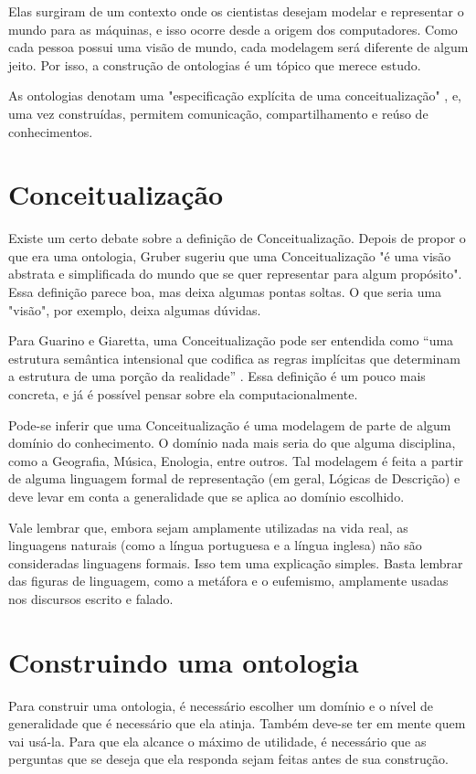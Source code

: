 Elas surgiram de um contexto onde os cientistas desejam modelar e representar o mundo para as máquinas, e isso ocorre desde a origem dos computadores. Como cada pessoa possui uma visão de mundo, cada modelagem será diferente de algum jeito. Por isso, a construção de ontologias é um tópico que merece estudo.

As ontologias denotam uma "especificação explícita de uma conceitualização"  \citep{ontoGruber}, e, uma vez construídas, permitem comunicação, compartilhamento e reúso de conhecimentos.

\section{Conceitualização}
	
Existe um certo debate sobre a definição de Conceitualização. Depois de propor o que era uma ontologia, Gruber sugeriu que uma Conceitualização "é uma visão abstrata e simplificada do mundo que se quer representar para algum propósito". Essa definição parece boa, mas deixa algumas pontas soltas. O que seria uma "visão", por exemplo, deixa algumas dúvidas.

Para Guarino e Giaretta, uma Conceitualização pode ser entendida como “uma estrutura semântica intensional que codifica as regras implícitas que determinam a estrutura de uma porção da realidade” \citep{ontoGiaretta}. Essa definição é um pouco mais concreta, e já é possível pensar sobre ela computacionalmente.

Pode-se inferir que uma Conceitualização é uma modelagem de parte de algum domínio do conhecimento. O domínio nada mais seria do que alguma disciplina, como a Geografia, Música, Enologia, entre outros. Tal modelagem é feita a partir de alguma linguagem formal de representação (em geral, Lógicas de Descrição) e deve levar em conta a generalidade que se aplica ao domínio escolhido.

Vale lembrar que, embora sejam amplamente utilizadas na vida real, as linguagens naturais (como a língua portuguesa e a língua inglesa) não são consideradas linguagens formais. Isso tem uma explicação simples. Basta lembrar das figuras de linguagem, como a metáfora e o eufemismo, amplamente usadas nos discursos escrito e falado. 

\section{Construindo uma ontologia}

Para construir uma ontologia, é necessário escolher um domínio e o nível de generalidade que é necessário que ela atinja. Também deve-se ter em mente quem vai usá-la. Para que ela alcance o máximo de utilidade, é necessário que as perguntas que se deseja que ela responda sejam feitas antes de sua construção.

